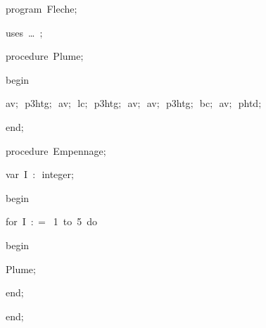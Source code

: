 
{
\parindent {}
\medskip

\carrenoir
\vspace{\neglskip}\mbox{\blc  \idt  \mcl program\idt \ Fleche$;$
}\par 
\vspace{\neglskip}\mbox{\blc \blk\idt \mcl uses\idt \ \ldots\ $;$
}\par 
\medskip

\pagebreak[3] 
\vspace{\neglskip}\mbox{\blc  \blk\idt  \mcl procedure\idt \ Plume$;$}\par 
\vspace{\neglskip}\mbox{\blc  \blk\idt  \mcl begin\idt }\par 
\vspace{\neglskip}\mbox{\blc  \blk\blk\idt  av$;$\ p3htg$;$\ av$;$\ lc$;$\ p3htg$;$\ av$;$\ av$;$\ p3htg$;$\ bc$;$\ av$;$\ phtd$;$}\par 
\vspace{\neglskip}\mbox{\blc  \blk\idt  \mcl end\idt $;$}\par 
\medskip

\pagebreak[3] 
\vspace{\neglskip}\mbox{\blc  \blk\idt  \mcl procedure\idt \ Empennage$;$}\par 
\pagebreak[3] 
\vspace{\neglskip}\mbox{\blc  \blk\blk\idt  \mcl var\idt \ I\ $:$\ integer$;$}\par 
\vspace{\neglskip}\mbox{\blc  \blk\idt  \mcl begin\idt }\par 
\pagebreak[3] 
\vspace{\neglskip}\mbox{\blc  \blk\blk\idt  \mcl for\idt \ I\ $:$$=$\ 1\ \mcl to\idt \ 5\ \mcl do\idt }\par 
\vspace{\neglskip}\mbox{\blc  \blk\blk\blk\idt  \mcl begin\idt }\par 
\vspace{\neglskip}\mbox{\blc  \blk\blk\blk\blk\idt  Plume$;$}\par 
\vspace{\neglskip}\mbox{\blc  \blk\blk\blk\idt  \mcl end\idt $;$}\par 
\vspace{\neglskip}\mbox{\blc  \blk\idt  \mcl end\idt $;$}\par 
\medskip

}

